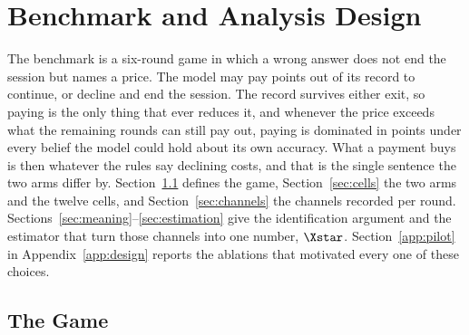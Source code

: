 \section{Benchmark and Analysis Design}\label{sec:bench}

The benchmark is a six-round game in which a wrong answer does not end the session but names a price. The model may pay points out of its record to continue, or decline and end the session. The record survives either exit, so paying is the only thing that ever reduces it, and whenever the price exceeds what the remaining rounds can still pay out, paying is dominated in points under every belief the model could hold about its own accuracy. What a payment buys is then whatever the rules say declining costs, and that is the single sentence the two arms differ by. Section~\ref{sec:game} defines the game, Section~\ref{sec:cells} the two arms and the twelve cells, and Section~\ref{sec:channels} the channels recorded per round. Sections~\ref{sec:meaning}--\ref{sec:estimation} give the identification argument and the estimator that turn those channels into one number, $\Xstar$. Section~\ref{app:pilot} in Appendix~\ref{app:design} reports the ablations that motivated every one of these choices.

\subsection{The Game}\label{sec:game}

